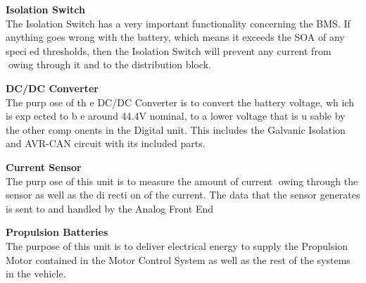 \textbf{Isolation Switch}\\
The Isolation Switch has a very important functionality concerning the BMS. If anything
goes wrong with the battery, which means it exceeds the SOA of any specied thresholds,
then the Isolation Switch will prevent any current from owing through it and to the
distribution block.

\textbf{DC/DC Converter}\\
The purp ose of th e DC/DC Converter is to convert the battery voltage, wh ich is exp ected
to b e around 44.4V nominal, to a lower voltage that is u sable by the other comp onents
in the Digital unit. This includes the Galvanic Isolation and AVR-CAN circuit with its
included parts.

\textbf{Current Sensor}\\
The purp ose of this unit is to measure the amount of current owing through the sensor
as well as the di recti on of the current. The data that the sensor generates is sent to and
handled by the Analog Front End

\textbf{Propulsion Batteries}\\
The purpose of this unit is to deliver electrical energy to supply the Propulsion Motor contained in the Motor Control System as well as the rest of the systems in the vehicle.